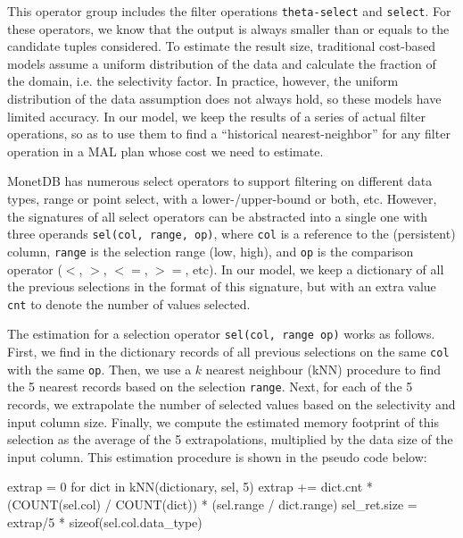 \documentclass[conference]{IEEEtran}
\begin{document}
%	
%	
%
%
This operator group includes the filter operations \texttt{\small theta-select} and \texttt{\small select}.
For these operators, we know that the output is always smaller than or equals to the candidate tuples considered.
To estimate the result size, traditional cost-based models assume a uniform distribution of the data and calculate the fraction of the domain, i.e. the selectivity factor.
In practice, however, the uniform distribution of the data assumption does not always hold, so these models have limited accuracy.
In our model, we keep the results of a series of actual filter operations, so as to use them to find a ``historical nearest-neighbor'' for any filter operation in a MAL plan whose cost we need to estimate.

MonetDB has numerous select operators to support filtering on different data types, range or point select, with a lower-/upper-bound or both, etc.
However, the signatures of all select operators can be abstracted into a single one with three operands \texttt{\small sel(col, range, op)}, where \texttt{\small col} is a reference to the (persistent) column, \texttt{\small range} is the selection range (low, high), and \texttt{\small op} is the comparison operator ($<$, $>$, $<=$, $>=$, etc).
In our model, we keep a dictionary of all the previous selections in the format of this signature, but with an extra value \texttt{\small cnt} to denote the number of values selected.

The estimation for a selection operator \texttt{\small sel(col, range op)} works as follows.
First, we find in the dictionary records of all previous selections on the same \texttt{\small col} with the same \texttt{\small op}.
Then, we use a $k$ nearest neighbour (kNN) procedure to find the 5 nearest records based on the selection \texttt{\small range}.
Next, for each of the 5 records, we extrapolate the number of selected values based on the selectivity and input column size. 
Finally, we compute the estimated memory footprint of this selection as the average of the 5 extrapolations, multiplied by the data size of the input column.
This estimation procedure is shown in the pseudo code below:
\begin{verb}
extrap = 0
for dict in kNN(dictionary, sel, 5)
  extrap += dict.cnt * (COUNT(sel.col) / COUNT(dict)) * 
            (sel.range / dict.range)
sel_ret.size = extrap/5 * sizeof(sel.col.data_type)
\end{verb}
\end{document}

